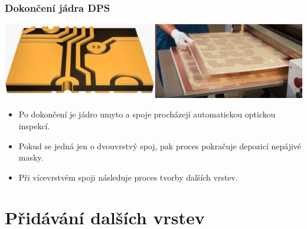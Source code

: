 \documentclass{beamer}
\begin{document}
\begin{frame}
	\frametitle{Dokončení jádra DPS}

	\begin{center}
		\includegraphics[scale=0.15]{jadroHotovo.png}
	\end{center}
	
	\begin{itemize}
		\item Po dokončení je jádro umyto a spoje procházejí automatickou optickou inspekcí.
		\item Pokud se jedná jen o dvouvrstvý spoj, pak proces pokračuje depozicí nepájivé masky.
		\item Při vícevrstvém spoji následuje proces tvorby dalších vrstev.
	\end{itemize}
\end{frame}

\section{\texorpdfstring{Přidávání dalších vrstev}{Pridavani dalsich vrstev}}
\end{document}
